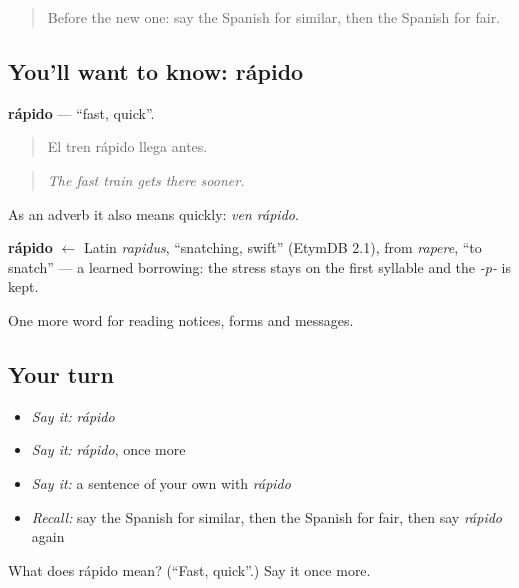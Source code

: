 \begin{quote}
Before the new one: say the Spanish for similar, then the Spanish for fair.
\end{quote}

\subsection*{You'll want to know: rápido}
\textbf{rápido} — \textquotedblleft{}fast, quick\textquotedblright{}.

\begin{quote}
El tren rápido llega antes.
\end{quote}

\begin{quote}
\emph{The fast train gets there sooner.}
\end{quote}

As an adverb it also means quickly: \emph{ven rápido}.

\begin{cousinweb}
\textbf{rápido} $\leftarrow$ Latin \emph{rapidus}, \textquotedblleft{}snatching, swift\textquotedblright{} (EtymDB 2.1), from \emph{rapere}, \textquotedblleft{}to snatch\textquotedblright{} — a learned borrowing: the stress stays on the first syllable and the \emph{-p-} is kept.
\end{cousinweb}

\begin{grammarlens}[title={What you've built}]
One more word for reading notices, forms and messages.
\end{grammarlens}

\subsection*{Your turn}
\begin{itemize}
\raggedright
  \item \emph{Say it:} \emph{rápido}
  \item \emph{Say it:} \emph{rápido}, once more
  \item \emph{Say it:} a sentence of your own with \emph{rápido}
  \item \emph{Recall:} say the Spanish for similar, then the Spanish for fair, then say \emph{rápido} again
\end{itemize}

\begin{tcolorbox}[breakable,colback=teal!4,colframe=teal!35!black,title={Before you move on}]
What does rápido mean? (\textquotedblleft{}Fast, quick\textquotedblright{}.) Say it once more.
\end{tcolorbox}
